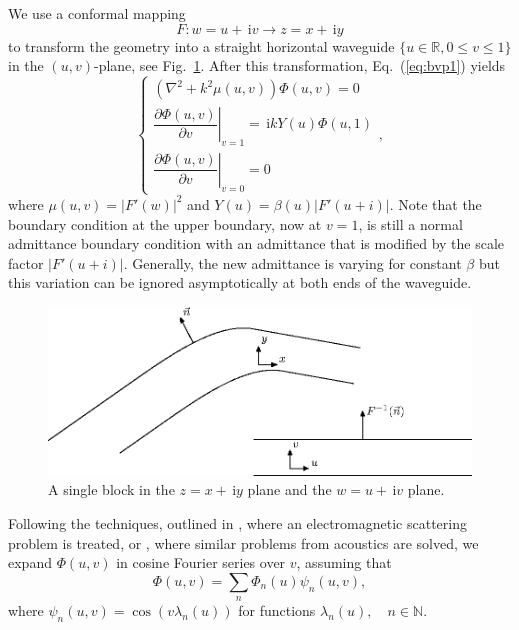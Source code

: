 \documentclass{svjour3}
\providecommand{\abs}[1]{\left\lvert#1\right\rvert}
\renewcommand{\Phi}{\varPhi}
\renewcommand{\i}{\,\mathrm{i}}
\newcommand{\R}{\mathbb R}
\newcommand{\pd}[2]{\dfrac{\partial#1}{\partial#2}}
\renewcommand{\Phi}{\varPhi}
\begin{document}
We use a conformal mapping
\begin{equation*}
  F:w=u+\i v\to z=x+\i y
\end{equation*}
to transform the geometry into a straight horizontal waveguide
\mbox{$\{u\in\R,0\le v\le1\}$} in the $(u,v)$-plane, see
Fig.~\ref{fig:confmap}. After this transformation, Eq.~(\ref{eq:bvp1})
yields
\begin{equation}
  \label{eq:bvp2}
  \begin{cases}
    \left(\nabla^2+k^2\mu(u,v)\right)\Phi(u,v)=0\\[1ex]
    \left.\pd{\Phi(u,v)}v\right|_{v=1}=\i kY(u)\Phi(u,1)\\[1.5ex]
    \left.\pd{\Phi(u,v)}v\right|_{v=0}=0
  \end{cases},
\end{equation}
where $\mu(u,v)=\abs{F'(w)}^2$ and $Y(u)=\beta(u)\abs{F'(u+i)}$. Note
that the boundary condition at the upper boundary, now at $v=1$, is
still a normal admittance boundary condition with an admittance that is
modified by the scale factor $\abs{F'(u+i)}$. Generally, the new
admittance is varying for constant $\beta$ but this variation can be
ignored asymptotically at both ends of the waveguide.
\begin{figure}[t]
  \centering
  \includegraphics[scale=1]{waveguide-3}
  \caption{A single block in the $z=x+\i y$ plane and the $w=u+\i v$
    plane.}
  \label{fig:confmap}
\end{figure}

Following the techniques, outlined in \cite{Andersson-Nilsson:2009},
where an electromagnetic scattering problem is treated, or
\cite{Nilsson:2002}, where similar problems from acoustics are solved,
we expand $\Phi(u,v)$ in cosine Fourier series over $v$, assuming that
\begin{equation}
  \label{eq:fcosseries}
  \Phi(u,v)=\sum_n\Phi_n(u)\psi_n(u,v),
\end{equation}
where $\psi_n(u,v)=\cos(v\lambda_n(u))$ for functions
$\lambda_n(u),\quad n\in\mathbb N$.
\end{document}
